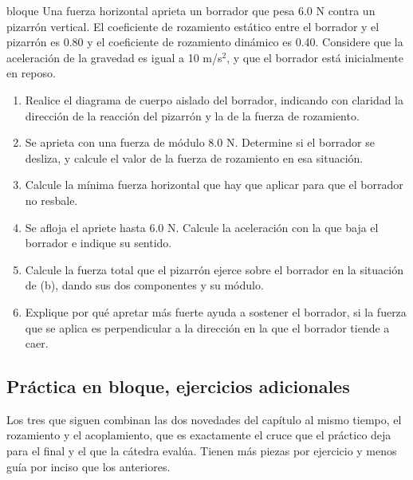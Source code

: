 \documentclass[11pt,openany]{book}
\begin{document}
\begin{ejercicio}{bloque}
Una fuerza horizontal aprieta un borrador que pesa 6.0 N contra un pizarrón vertical. El coeficiente de rozamiento estático entre el borrador y el pizarrón es 0.80 y el coeficiente de rozamiento dinámico es 0.40. Considere que la aceleración de la gravedad es igual a 10 m/s$^2$, y que el borrador está inicialmente en reposo.
\begin{enumerate}[label=(\alph*), leftmargin=1.7em, itemsep=1pt, topsep=3pt]
  \item Realice el diagrama de cuerpo aislado del borrador, indicando con claridad la dirección de la reacción del pizarrón y la de la fuerza de rozamiento.
  \item Se aprieta con una fuerza de módulo 8.0 N. Determine si el borrador se desliza, y calcule el valor de la fuerza de rozamiento en esa situación.
  \item Calcule la mínima fuerza horizontal que hay que aplicar para que el borrador no resbale.
  \item Se afloja el apriete hasta 6.0 N. Calcule la aceleración con la que baja el borrador e indique su sentido.
  \item Calcule la fuerza total que el pizarrón ejerce sobre el borrador en la situación de (b), dando sus dos componentes y su módulo.
  \item Explique por qué apretar más fuerte ayuda a sostener el borrador, si la fuerza que se aplica es perpendicular a la dirección en la que el borrador tiende a caer.
\end{enumerate}
\end{ejercicio}

\subsection{Práctica en bloque, ejercicios adicionales}

Los tres que siguen combinan las dos novedades del capítulo al mismo tiempo, el rozamiento y el acoplamiento, que es exactamente el cruce que el práctico deja para el final y el que la cátedra evalúa. Tienen más piezas por ejercicio y menos guía por inciso que los anteriores.
\end{document}
